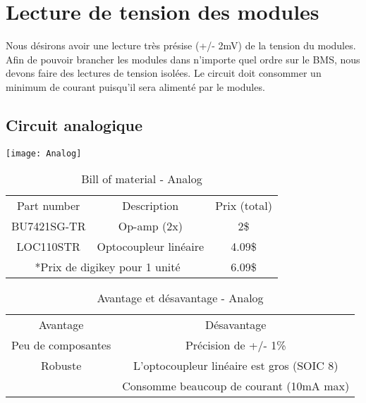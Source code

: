 

\section{Lecture de tension des modules}
				Nous d\'{e}sirons avoir une lecture tr\`{e}s pr\'{e}sise (+/- 2mV) de la tension du modules. Afin de pouvoir brancher les modules dans n'importe quel ordre sur le BMS, nous devons faire des lectures de tension isol\'{e}es. Le circuit doit consommer un minimum de courant puisqu'il sera aliment\'{e} par le modules.
			\subsection{Circuit analogique}
				
				\begin{center}
					\texttt{[image: Analog]} \\ \vspace{0cm}
				\end{center}
			
					\begin{table}[h!]	
						\centering
						\begin{tabular}{|c|c|c|}
							\hline
							Part number & Description & Prix (total)\\ \hhline{|=|=|=|}
							BU7421SG-TR & Op-amp (2x) & 2\$ \\ \hline
							LOC110STR & Optocoupleur lin\'{e}aire & 4.09\$ \\ \hline
							 \multicolumn{2}{|c|}{*Prix de digikey pour 1 unit\'{e} }& 6.09\$ \\ \hline
						\end{tabular}
						\caption{Bill of material - Analog}
						\label{Table:BOM_Analog}
					\end{table}
						
					\begin{table}[h!]
					\centering
						\begin{tabular}{|c|c|}
							\hline
							Avantage & D\'{e}savantage\\ \hhline{|=|=|}
							Peu de composantes & Pr\'{e}cision de +/- 1\% \\ \hline
							Robuste & L'optocoupleur lin\'{e}aire est gros (SOIC 8)\\ \hline
							 & Consomme beaucoup de courant (10mA max)\\ \hline
						\end{tabular}
						\caption{Avantage et d\'{e}savantage - Analog}
						\label{Table:Analyse_Analog}
					\end{table} 
					
